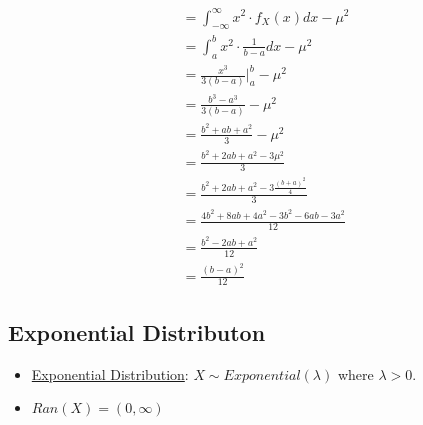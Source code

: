 \documentclass[12pt]{article}
\begin{document}
\begin{itemize}
\begin{align*}
                    &= \int_{-\infty}^{\infty} x^2 \cdot f_X(x) dx - \mu^2 \\
                    &= \int_{a}^{b} x^2 \cdot \frac{1}{b-a} dx - \mu^2 \\
                    &= \frac{x^3}{3(b-a)} \Big|_{a}^{b} - \mu^2 \\
                    &= \frac{b^3 - a^3}{3(b-a)} - \mu^2 \\
                    &= \frac{b^2 + ab + a^2}{3} - \mu^2 \\
                    &= \frac{b^2 + 2ab + a^2 - 3\mu^2}{3} \\
                    &= \frac{b^2 + 2ab + a^2 - 3\frac{{(b+a)}^2}{4}}{3} \\
                    &= \frac{4b^2 + 8ab + 4a^2 - 3b^2 - 6ab - 3a^2}{12} \\
                    &= \frac{b^2 - 2ab + a^2}{12} \\
                    &= \frac{{(b-a)}^2}{12} 
                \end{align*}
            \end{itemize}
        \subsection{Exponential Distributon}
            \begin{itemize}
                \item \underline{Exponential Distribution}: $X \sim Exponential(\lambda)$ where $\lambda > 0$.
                \item $Ran(X) = (0, \infty)$
            \end{itemize}
\end{document}
